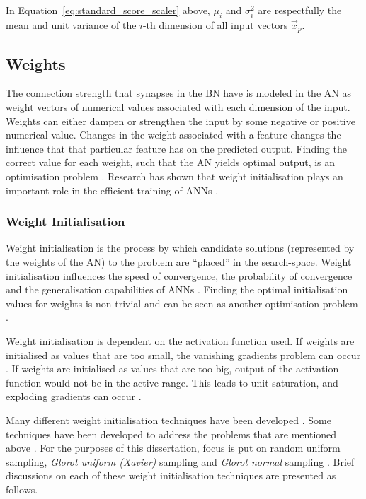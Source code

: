 \noindent
In Equation~\eqref{eq:standard_score_scaler} above, $\mu_i$ and $\sigma^2_i$ are respectfully the mean and unit variance of the $i$-th dimension of all input vectors $\vec{x}_p$.

\subsection{Weights}\label{sec:anns:an:weights}

The connection strength that synapses in the \acs{BN} have is modeled in the \acs{AN} as weight vectors of numerical values associated with each dimension of the input. Weights can either dampen or strengthen the input by some negative or positive numerical value. Changes in the weight associated with a feature changes the influence that that particular feature has on the predicted output. Finding the correct value for each weight, such that the \acs{AN} yields optimal output, is an optimisation problem \cite{ref:thierens:1993}. Research has shown that weight initialisation plays an important role in the efficient training of \acp{ANN} \cite{ref:thimm:1995}.

\subsubsection{Weight Initialisation}\label{sec:anns:an:weights:initialisation}

Weight initialisation is the process by which candidate solutions (represented by the weights of the \acs{AN}) to the problem are ``placed'' in the search-space. Weight initialisation influences the speed of convergence, the probability of convergence and the generalisation capabilities of \acp{ANN} \cite{ref:fernandez:2001}. Finding the optimal initialisation values for weights is non-trivial and can be seen as another optimisation problem \cite{ref:de:2016, ref:erdogmus:2003, ref:yam:2000}.

Weight initialisation is dependent on the activation function used. If weights are initialised as values that are too small, the vanishing gradients problem can occur \cite{ref:hanin:2018}. If weights are initialised as values that are too big, output of the activation function would not be in the active range. This leads to unit saturation, and exploding gradients can occur \cite{ref:hanin:2018, ref:yadav:2018}.

Many different weight initialisation techniques have been developed \cite{ref:erdogmus:2003}. Some techniques have been developed to address the problems that are mentioned above \cite{ref:yadav:2018}. For the purposes of this dissertation, focus is put on random uniform sampling, \textit{Glorot uniform (Xavier)} sampling and \textit{Glorot normal} sampling \cite{ref:glorot:2010}. Brief discussions on each of these weight initialisation techniques are presented as follows.


